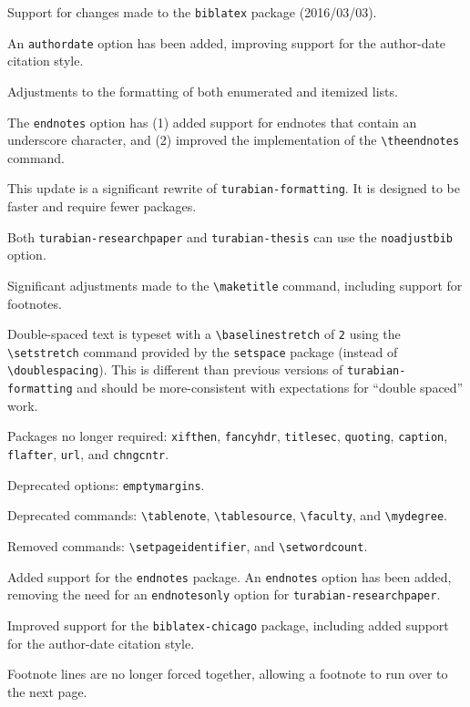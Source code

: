 \documentclass{article}
\newcommand{\textcmd}[1]{\texttt{\textbackslash #1}}
\begin{document}
Support for changes made to the \texttt{biblatex} package (2016/03/03).

 An \texttt{authordate} option has been added, improving support for the author-date citation style.

Adjustments to the formatting of both enumerated and itemized lists.

The \texttt{endnotes} option has (1) added support for endnotes that contain an underscore character, and (2) improved the implementation of the \textcmd{theendnotes} command.

%

This update is a significant rewrite of \texttt{turabian-formatting}. It is designed to be faster and require fewer packages.

Both \texttt{turabian-researchpaper} and \texttt{turabian-thesis} can use the \texttt{noadjustbib} option.

Significant adjustments made to the \textcmd{maketitle} command, including support for footnotes.

Double-spaced text is typeset with a \textcmd{baselinestretch} of \texttt{2} using the \textcmd{setstretch} command provided by the \texttt{setspace} package (instead of \textcmd{doublespacing}). This is different than previous versions of \texttt{turabian-formatting} and should be more-consistent with expectations for ``double spaced'' work.

Packages no longer required: \texttt{xifthen}, \texttt{fancyhdr}, \texttt{titlesec}, \texttt{quoting}, \texttt{caption}, \texttt{flafter}, \texttt{url}, and \texttt{chngcntr}.

Deprecated options: \texttt{emptymargins}.

Deprecated commands: \textcmd{tablenote}, \textcmd{tablesource}, \textcmd{faculty}, and \textcmd{mydegree}.

Removed commands: \textcmd{setpageidentifier}, and \textcmd{setwordcount}.

%

Added support for the \texttt{endnotes} package. An \texttt{endnotes} option has been added, removing the need for an \texttt{endnotesonly} option for \texttt{turabian-researchpaper}.

Improved support for the \texttt{biblatex-chicago} package, including added support for the author-date citation style.

Footnote lines are no longer forced together, allowing a footnote to run over to the next page.
\end{document}
